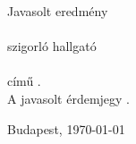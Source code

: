 \documentclass[a4paper,12pt]{article}
\begin{document}
\thispagestyle{empty}
\begin{center}
 \huge
 Javasolt eredmény\\
 \normalsize
 \vspace{1.5cm}
 \textbf{\jelolt}\\
 szigorló \kepzes{} hallgató\\
 \dolgozatcim\\
 című \dolgozattipusahoz{}.\\
 \vspace{1cm}
 A javasolt érdemjegy \textbf{\erdemjegy{}}.
\end{center}


\begin{flushleft}
\vspace*{1cm}
Budapest, \today
\end{flushleft}

\begin{flushright}
 \vspace*{1cm}
 \makebox[7cm]{\rule{6cm}{.4pt}}\\
 \makebox[7cm]{\emph{\biralo}}\\
\end{flushright}
\end{document}
